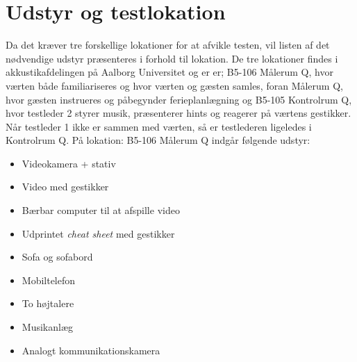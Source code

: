 \section{Udstyr og testlokation}
\label{UdstyrLokationSocialAccept}
%
Da det kræver tre forskellige lokationer for at afvikle testen, vil listen af det nødvendige udstyr præsenteres i forhold til lokation. De tre lokationer findes i akkustikafdelingen på Aalborg Universitet og er er; B5-106 Målerum Q, hvor værten både familiariseres og hvor værten og gæsten samles, foran Målerum Q, hvor gæsten instrueres og påbegynder ferieplanlægning og B5-105 Kontrolrum Q, hvor testleder 2 styrer musik, præsenterer hints og reagerer på værtens gestikker. Når testleder 1 ikke er sammen med værten, så er testlederen ligeledes i Kontrolrum Q. \blankline
%
På lokation: B5-106 Målerum Q indgår følgende udstyr: 
\begin{itemize}
\item Videokamera + stativ
\item Video med gestikker
\item Bærbar computer til at afspille video
\item Udprintet \textit{cheat sheet} med gestikker
\item Sofa og sofabord
\item Mobiltelefon
\item To højtalere 
\item Musikanlæg
\item Analogt kommunikationskamera\blankline
\noindent
\end{itemize}
%
